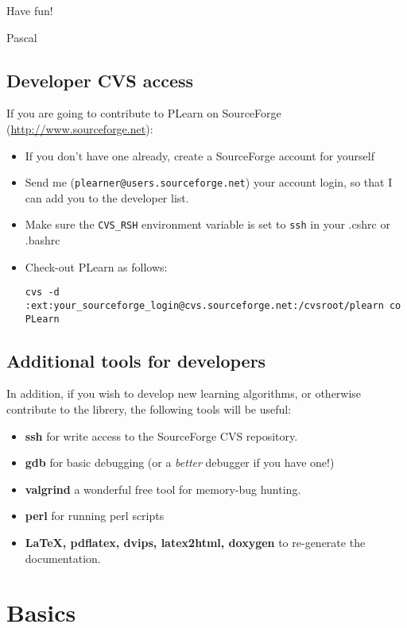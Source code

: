 \documentclass[11pt]{book}
\begin{document}
 Have fun! 


 Pascal 


\section{Developer CVS access}

If you are going to contribute to PLearn on SourceForge
(\url{http://www.sourceforge.net}):
\begin{itemize}
\item If you don't have one already, create a SourceForge account for yourself
\item Send me ({\tt plearner@users.sourceforge.net}) your account login,
so that I can add you to the developer list.
\item Make sure the {\tt CVS\_RSH} environment variable is set to
{\tt ssh} in your .cshrc or .bashrc
\item Check-out PLearn as follows:
\begin{verbatim}
cvs -d :ext:your_sourceforge_login@cvs.sourceforge.net:/cvsroot/plearn co PLearn
\end{verbatim}
\end{itemize}



\section{Additional tools for developers}

In addition, if you wish to develop new learning algorithms, or otherwise
 contribute to the librery, the following tools will be useful:
\begin{itemize}
\item {\bf ssh} for write access to the SourceForge CVS repository.
\item {\bf gdb} for basic debugging (or a {\em better} debugger if you have one!)
\item {\bf valgrind} a wonderful free tool for memory-bug hunting.
\item {\bf perl} for running perl scripts
\item {\bf LaTeX, pdflatex, dvips, latex2html, doxygen} to re-generate the documentation. 
\end{itemize}

\chapter{Basics}
\end{document}
